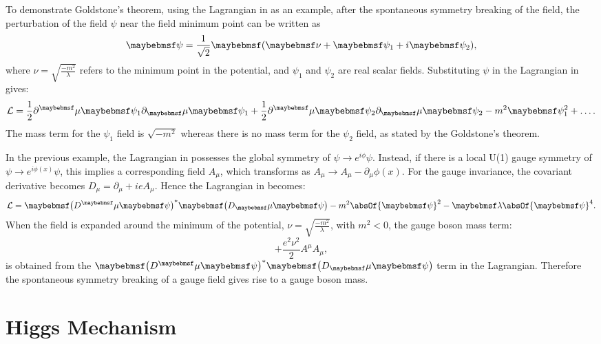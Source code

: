 To demonstrate Goldstone's theorem, using the Lagrangian in  as an example, after the spontaneous symmetry breaking of the field, the perturbation of the field $\psi$ near the field minimum point can be written as
 \begin{equation}
\psi = \frac{1}{\sqrt{2}}\parenths{\nu+\psi_1+i\psi_2},
\end{equation}
where $\nu=\sqrt{\frac{-m^2}{\lambda}}$ refers to the minimum point in the potential, and $\psi_1$ and $\psi_2$ are real scalar fields. Substituting $\psi$ in the Lagrangian in  gives:
\begin{equation}
\Lagr = \frac{1}{2}\partial^\mu{\psi_1}\partial_\mu\psi_1 + \frac{1}{2}\partial^\mu{\psi_2}\partial_\mu\psi_2 - m^2 \psi_1^2 + \hdots.
\end{equation}
The mass term for the $\psi_1$ field is $\sqrt{-m^2}$ whereas there is no mass term for the $\psi_2$ field, as stated by the Goldstone's theorem.

In the previous example, the Lagrangian in  possesses  the global symmetry of $\psi \to e^{i\phi}\psi$. Instead, if there is a local U(1) gauge symmetry of  $\psi \to e^{i\phi(x)}\psi$, this implies a corresponding field $A_{\mu}$, which transforms as $A_\mu \to A_\mu - \partial_\mu\phi(x)$. For the gauge invariance, the covariant derivative becomes $D_\mu = \partial_\mu+ieA_\mu$. Hence the Lagrangian in  becomes:
\begin{equation}
\Lagr = \parenths{D^\mu{\psi}}^*\parenths{D_\mu\psi} - m^2 \absOf{\psi}^2    - \lambda\absOf{\psi}^4.
\end{equation}
When the field is expanded around the minimum of the potential,  $\nu=\sqrt{\frac{-m^2}{\lambda}}$, with $m^2<0$,  the gauge boson mass term:
\begin{equation}
+\frac{e^2\nu^2}{2}A^\mu{A}_\mu,
\end{equation}
 is obtained from the $\parenths{D^\mu{\psi}}^*\parenths{D_\mu\psi} $ term in the Lagrangian. Therefore the spontaneous symmetry breaking of a gauge field gives rise to a gauge boson mass.

\section{Higgs Mechanism}
\label{sec:theoryHiggs}

